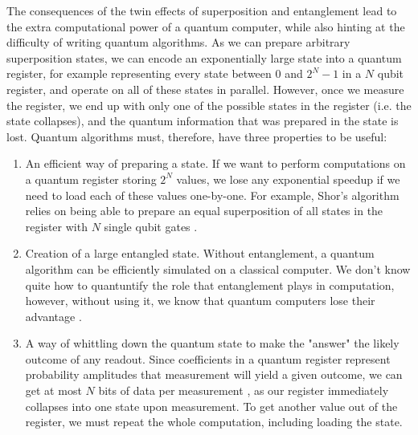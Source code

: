 The consequences of the twin effects of superposition and entanglement lead to the extra computational
power of a quantum computer, while also hinting at the difficulty of writing quantum algorithms. As we
can prepare arbitrary superposition states, we can encode an exponentially large
state into a quantum register, for example representing every state between 0 and $2^N-1$ in a $N$ qubit
register, and operate on all of these states in parallel. However, once we measure the register, we end up
with only one of the possible states in the register (i.e. the state collapses), and the quantum information
that was prepared in the state is lost. Quantum algorithms must, therefore, have three properties to be useful:
\begin{enumerate}
  \item An efficient way of preparing a state. If we want to perform computations on a quantum register
    storing $2^N$ values, we lose any exponential speedup if we need to load each of these values one-by-one.
    For example, Shor's algorithm relies on being able to prepare an equal superposition of all states
    in the register with $N$ single qubit gates \cite{PhysRevA.54.1034}.
  \item Creation of a large entangled state. Without entanglement, a quantum algorithm can be efficiently
    simulated on a classical computer. We don't know quite how to quantuntify the role that entanglement plays in computation,
    however, without using it, we know that quantum computers lose their advantage \cite{doi:10.1098/rspa.2002.1097}.
  \item A way of whittling down the quantum state to make the "answer" the likely outcome of any readout.
    Since coefficients in a quantum register represent probability amplitudes that measurement will yield
    a given outcome, we can get at most $N$ bits of data per measurement \cite{651037}, as our register
    immediately collapses into one state upon measurement. To get another value out of the register,
    we must repeat the whole computation, including loading the state.
\end{enumerate}

